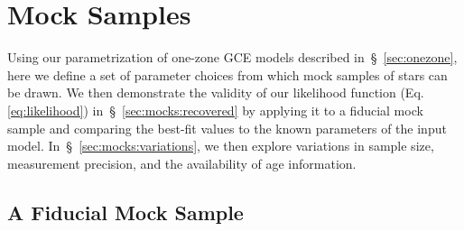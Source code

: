 \documentclass[foo.tex]{subfiles}
\begin{document}
\section{Mock Samples}
\label{sec:mocks}

Using our parametrization of one-zone GCE models described
in~\S~\ref{sec:onezone}, here we define a set of parameter choices from which
mock samples of stars can be drawn.
We then demonstrate the validity of our likelihood function (Eq.
\ref{eq:likelihood}) in~\S~\ref{sec:mocks:recovered} by applying it to a
fiducial mock sample and comparing the best-fit values to the known parameters
of the input model.
In~\S~\ref{sec:mocks:variations}, we then explore variations in sample size,
measurement precision, and the availability of age information.

\subsection{A Fiducial Mock Sample}
\label{sec:mocks:fiducial}
\end{document}
